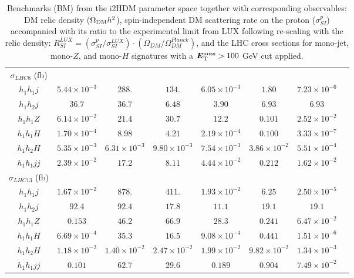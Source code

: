 \documentclass[12pt,a4paper]{article}
\newcommand{\MET}{\textbf{\textit{E}$_{\rm T}^{\rm miss}$}}
\begin{document}
\begin{table}[htb]
\begin{tabular}{|c||c|c|c|c|c|c|c|}
 \hline 
  $\sigma_{LHC8}$ (fb) &&&&&&\\
  ${h_1 h_1 j}$  		& $5.44\times 10^{-3}$ 	&  $288.$  		& $134.$  		& $6.05\times 10^{-3}$ 	&  $1.80$ 		&  $7.23\times 10^{-6}$ \\
  ${h_1 h_2 j}$  		& $36.7$      		&  $36.7$ 		& $6.48$  		& $3.90$ 		&  $6.93$ 		&  $6.93$ \\
  ${h_1h_1 Z}$  		& $6.14\times 10^{-2}$  &  $21.4$  		& $30.7$  		& $12.2$		&  $0.101$ 		&  $2.52\times 10^{-2}$ \\
  ${h_1h_1 H}$  		& $1.70\times 10^{-4}$  &  $8.98$  		& $4.21$  		& $2.19\times 10^{-4}$ 	&  $0.100$ 		&  $3.33\times 10^{-7}$ \\
  ${h_1h_2 H}$  		& $5.35\times 10^{-3}$  &  $6.31\times 10^{-3}$ & $9.80\times 10^{-3}$  & $7.54\times 10^{-3}$ 	&  $3.86\times 10^{-2}$ &  $5.51\times 10^{-4}$ \\
  ${h_1 h_1 jj}$		& $2.39\times 10^{-2}$	&  $17.2$  		& $8.11$  		& $4.44\times 10^{-2}$ 	&  $0.212$		&  $1.62\times 10^{-2}$ \\
 \hline 
  $\sigma_{LHC13}$ (fb) &&&&&&\\
  ${h_1 h_1 j}$  		& $1.67\times 10^{-2}$ 	&  $878.$  		& $411.$  		& $1.93\times 10^{-2}$ 	&  $6.25$ 		& $2.50\times 10^{-5} $ \\
  ${h_1 h_2 j}$  		& $92.4$      		&  $92.4$  		& $17.8$  		& $11.1$ 		&  $19.1$ 		&  $19.1$ \\
  ${h_1h_1 Z}$  		& $0.153$       	&  $46.2$  		& $66.9$  		& $28.3$ 		&  $0.241$ 		&  $6.47\times 10^{-2}$ \\
  ${h_1h_1 H}$  		& $6.69\times 10^{-4}$  &  $35.3$  		& $16.5$  		& $9.08\times 10^{-4}$ 	&  $0.441$ 		&  $1.51\times 10^{-6}$ \\
  ${h_1h_2 H}$  		& $1.18\times 10^{-2}$  &  $1.40\times 10^{-2}$ & $2.47\times 10^{-2}$  & $1.99\times 10^{-2}$ 	&  $9.82\times 10^{-2}$ &  $1.34\times 10^{-3}$ \\
  ${h_1 h_1 jj}$ 		& $0.101$	     	&  $62.7$  		& $29.6$  		& $0.189$ 		&  $0.904$ 		&  $7.49\times 10^{-2}$ \\
  \hline\hline
\end{tabular}
\caption{Benchmarks (BM) from the i2HDM parameter space
together with corresponding observables: DM relic density ($\Omega_{\rm DM} h^2$),
 spin-independent  DM scattering rate on the proton ($\sigma_{SI}^p$)
accompanied with its ratio to the experimental limit from LUX following re-scaling with the relic density: 
$R_{SI}^{LUX} =(\sigma_{SI}^p/\sigma_{SI}^{LUX})\cdot (\Omega_{DM}/\Omega_{DM}^{Planck})$,
and the LHC cross sections for mono-jet, mono-$Z$, and mono-$H$ signatures with a $\MET > 100$ GeV cut applied.
\label{tab:i2HDMbenchMarks}}
\end{table}
\end{document}
